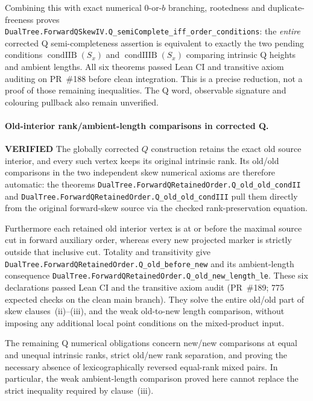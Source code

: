 \documentclass[11pt]{article}
\newcommand{\ok}{\textcolor{green!40!black}{\textbf{VERIFIED}}}
\newcommand{\lean}[1]{\texttt{#1}}
\begin{document}
Combining this with exact numerical $0$-or-$b$ branching,
rootedness and duplicate-freeness proves
\lean{DualTree.ForwardQSkewIV.Q_semiComplete_iff_order_conditions}:
the \emph{entire} corrected Q semi-completeness assertion
is equivalent to exactly the two pending conditions
$\operatorname{condIIB}(S_x)$ and
$\operatorname{condIIIB}(S_x)$ comparing intrinsic Q heights
and ambient lengths. All six theorems passed Lean CI and transitive axiom auditing
on PR~\#188 before clean integration. This is a precise reduction,
not a proof of those remaining inequalities. The Q
word, observable signature and colouring pullback also
remain unverified.

\paragraph{Old-interior rank/ambient-length comparisons in corrected Q.} \ok
The globally corrected $Q$ construction retains the exact
old source interior, and every such vertex keeps its
original intrinsic rank. Its old/old comparisons in the
two independent skew numerical axioms are therefore
automatic: the theorems
\lean{DualTree.ForwardQRetainedOrder.Q_old_old_condII}
and
\lean{DualTree.ForwardQRetainedOrder.Q_old_old_condIII}
pull them directly from the original forward-skew source
via the checked rank-preservation equation.

Furthermore each retained old interior vertex is at
or before the maximal source cut in forward auxiliary
order, whereas every new projected marker is strictly
outside that inclusive cut. Totality and transitivity
give \lean{DualTree.ForwardQRetainedOrder.Q_old_before_new}
and its ambient-length consequence
\lean{DualTree.ForwardQRetainedOrder.Q_old_new_length_le}.
These six declarations passed Lean CI and the transitive axiom audit
(PR~\#189; 775 expected checks on the clean main branch). They solve the entire old/old part of skew
clauses~(ii)--(iii), and the weak old-to-new length
comparison, without imposing any additional local
point conditions on the mixed-product input.

The remaining Q numerical obligations concern
new/new comparisons at equal and unequal intrinsic
ranks, strict old/new rank separation, and proving
the necessary absence of lexicographically reversed
equal-rank mixed pairs. In particular, the weak
ambient-length comparison proved here cannot
replace the strict inequality required by clause~(iii).
\end{document}
